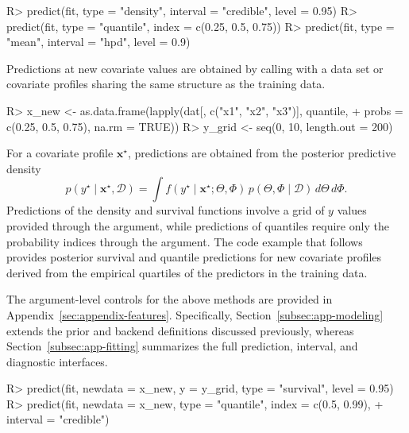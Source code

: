 \documentclass[article]{jss}\usepackage[]{graphicx}\usepackage[]{xcolor}
\renewenvironment{Schunk}{\vspace{0pt}}{\vspace{-0.1\baselineskip}}
\begin{document}
\begin{Schunk}
\begin{Sinput}
R> predict(fit, type = "density", interval = "credible", level = 0.95)
R> predict(fit, type = "quantile", index = c(0.25, 0.5, 0.75))
R> predict(fit, type = "mean", interval = "hpd", level = 0.9)
\end{Sinput}
\end{Schunk}

Predictions at new covariate values are obtained by calling
 with a data set or covariate profiles sharing the
same structure as the training data.

\begin{Schunk}
\begin{Sinput}
R> x_new <- as.data.frame(lapply(dat[, c("x1", "x2", "x3")], quantile,
+                  probs = c(0.25, 0.5, 0.75), na.rm = TRUE))
R> y_grid <- seq(0, 10, length.out = 200)
\end{Sinput}
\end{Schunk}

For a covariate profile $\boldsymbol{x}^\star$, predictions are obtained from the
posterior predictive density
\begin{equation*}
p(y^\star\mid \boldsymbol{x}^\star, \mathcal{D})
=\int f(y^\star\mid \boldsymbol{x}^\star; \Theta, \Phi)\,p(\Theta, \Phi\mid \mathcal{D})\,d\Theta\,d\Phi.
\end{equation*}
Predictions of the density and survival functions involve a grid of $y$
values provided through the  argument, while predictions of quantiles
require only the probability indices through the  argument.
The code example that follows provides posterior survival and quantile
predictions for new covariate profiles derived from the empirical
quartiles of the predictors in the training data.

The argument-level controls for the above methods are provided in
Appendix~\ref{sec:appendix-features}. Specifically,
Section~\ref{subsec:app-modeling} extends the prior and backend
definitions discussed previously, whereas Section~\ref{subsec:app-fitting} summarizes the full prediction,
interval, and diagnostic interfaces.

\begin{Schunk}
\begin{Sinput}
R> predict(fit, newdata = x_new, y = y_grid, type = "survival", level = 0.95)
R> predict(fit, newdata = x_new, type = "quantile", index = c(0.5, 0.99),
+                             interval = "credible")
\end{Sinput}
\end{Schunk}
\end{document}
